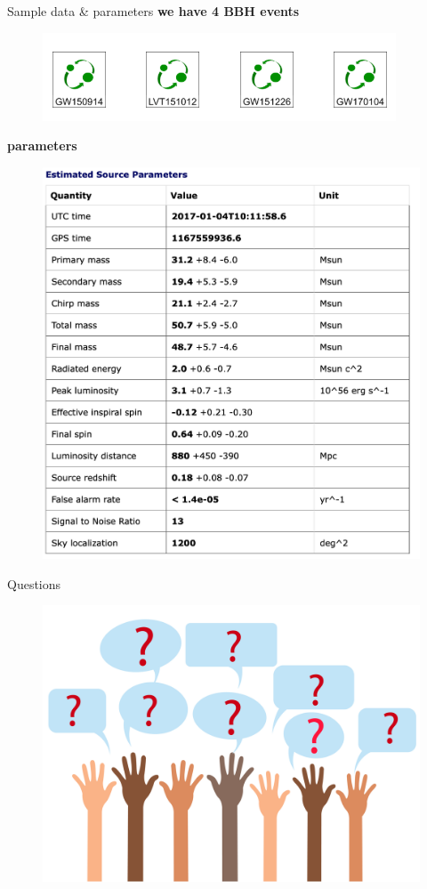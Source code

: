 \documentclass[11pt]{beamer}
\begin{document}
\begin{frame}{Sample data & parameters}
    \textbf{we have 4 BBH events}
    \begin{figure}[!t]
    \includegraphics[width = 0.3\columnwidth]{data.PNG}
    \end{figure}
    \textbf{parameters}\\
    \usepackage{example of GW150914}
    \begin{figure}[!t]
    \includegraphics[width = 0.4\columnwidth]{prameters.png}
    \end{figure}
\end{frame}

\begin{frame}{Questions}
    \begin{figure}[!t]
    \includegraphics[width = 0.9\columnwidth]{questions.jpg}
    \end{figure}
\end{frame}
\end{document}
